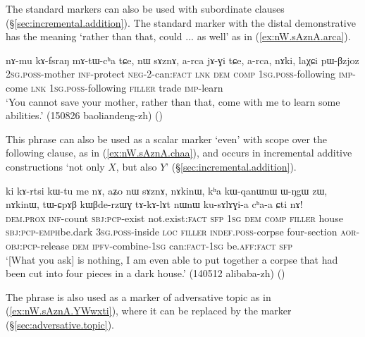  The standard markers can also be used with subordinate clauses (§\ref{sec:incremental.addition}). The standard marker with the distal demonstrative  has the meaning `rather than that, could ... as well' as in (\ref{ex:nW.sAznA.arca}).  
 
 \begin{exe}
 \ex \label{ex:nW.sAznA.arca}
 \gll  nɤ-mu kɤ-fsraŋ mɤ-tɯ-cʰa tɕe, nɯ sɤznɤ, a-rca jɤ-ɣi tɕe, a-rca, nɤki, laχɕi pɯ-βzjoz \\
 \textsc{2sg}.\textsc{poss}-mother \textsc{inf}-protect \textsc{neg}-2-can:\textsc{fact} \textsc{lnk} \textsc{dem} \textsc{comp} \textsc{1sg}.\textsc{poss}-following \textsc{imp}-come \textsc{lnk} \textsc{1sg}.\textsc{poss}-following \textsc{filler} trade \textsc{imp}-learn \\
\glt `You cannot save your mother, rather than that, come with me to learn  some abilities.' (150826 baoliandeng-zh)
()
\end{exe}

This phrase can also be used as a scalar marker `even' with scope over the following clause, as in (\ref{ex:nW.sAznA.chaa}), and occurs in incremental additive constructions `not only $X$, but also $Y$' (§\ref{sec:incremental.addition}).
 

 \begin{exe}
 \ex \label{ex:nW.sAznA.chaa}
 \gll ki kɤ-rtsi kɯ-tu me nɤ, aʑo nɯ sɤznɤ, nɤkinɯ, kʰa kɯ-qanɯ\redp{}nɯ ɯ-ŋgɯ zɯ, nɤkinɯ, tɯ-ɕpɤβ kɯβde-rzɯɣ tɤ-kɤ-lɤt nɯnɯ ku-sɤlɤɣi-a cʰa-a ɕti nɤ! \\
 \textsc{dem}.\textsc{prox} \textsc{inf}-count \textsc{sbj}:\textsc{pcp}-exist not.exist:\textsc{fact} \textsc{sfp} \textsc{1sg} \textsc{dem} \textsc{comp} \textsc{filler} house   \textsc{sbj}:\textsc{pcp}-\textsc{emph}\redp{}be.dark \textsc{3sg}.\textsc{poss}-inside \textsc{loc}  \textsc{filler} \textsc{indef}.\textsc{poss}-corpse four-section \textsc{aor}-\textsc{obj}:\textsc{pcp}-release \textsc{dem} \textsc{ipfv}-combine-\textsc{1sg} can:\textsc{fact}-\textsc{1sg} be.\textsc{aff}:\textsc{fact} \textsc{sfp}  \\
\glt  `[What you ask] is nothing, I am even able to put together a corpse that had been cut into four pieces in a dark house.'  (140512 alibaba-zh)
()
\end{exe}

The phrase  is also used as a marker of adversative topic as in (\ref{ex:nW.sAznA.YWwxti}), where it can be replaced by the marker  (§\ref{sec:adversative.topic}).

